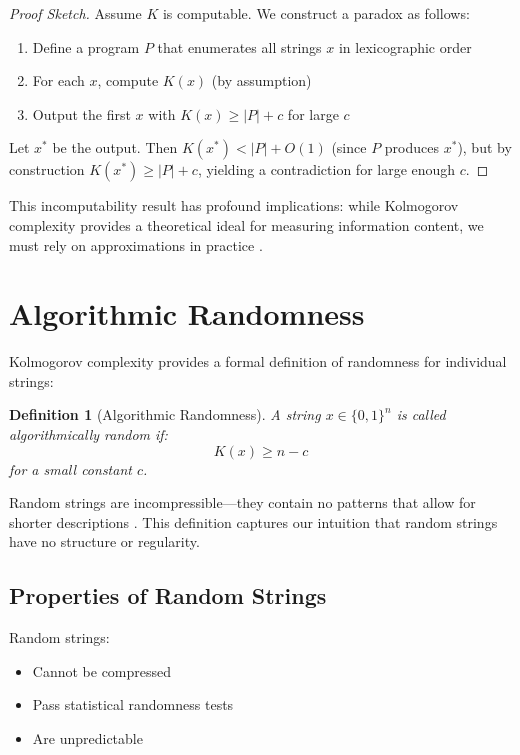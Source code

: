\documentclass[12pt,a4paper]{report}
\newtheorem{definition}[theorem]{Definition}
\begin{document}
\begin{proof}[Proof Sketch]
Assume $K$ is computable. We construct a paradox as follows:
\begin{enumerate}
    \item Define a program $P$ that enumerates all strings $x$ in lexicographic order
    \item For each $x$, compute $K(x)$ (by assumption)
    \item Output the first $x$ with $K(x) \geq |P| + c$ for large $c$
\end{enumerate}
Let $x^*$ be the output. Then $K(x^*) < |P| + O(1)$ (since $P$ produces $x^*$), but by construction $K(x^*) \geq |P| + c$, yielding a contradiction for large enough $c$.
\end{proof}

This incomputability result has profound implications: while Kolmogorov complexity provides a theoretical ideal for measuring information content, we must rely on approximations in practice \cite{fortnow2022kolmogorov}.

\section{Algorithmic Randomness}

Kolmogorov complexity provides a formal definition of randomness for individual strings:

\begin{definition}[Algorithmic Randomness]
A string $x \in \{0,1\}^n$ is called \textit{algorithmically random} if:
\begin{equation}
K(x) \geq n - c
\end{equation}
for a small constant $c$.
\end{definition}

Random strings are incompressible—they contain no patterns that allow for shorter descriptions \cite{martin1966definition}. This definition captures our intuition that random strings have no structure or regularity.

\subsection{Properties of Random Strings}

Random strings:
\begin{itemize}
    \item Cannot be compressed
    \item Pass statistical randomness tests
    \item Are unpredictable
\end{itemize}
\end{document}
